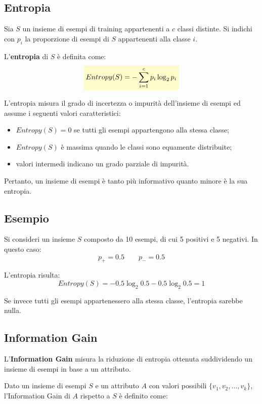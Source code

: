 \documentclass[a4paper,12pt]{report}
\newcommand{\highlight}[1]{%
\colorbox{yellow!20}{$\displaystyle #1$}%
}
\begin{document}
\subsection{Entropia}

Sia \( S \) un insieme di esempi di training appartenenti a \( c \) classi distinte.
Si indichi con \( p_i \) la proporzione di esempi di \( S \) appartenenti alla classe \( i \).

L’\textbf{entropia} di \( S \) è definita come:
\[
\highlight{
Entropy(S) = - \sum_{i=1}^{c} p_i \log_2 p_i }
\]

L’entropia misura il grado di incertezza o impurità dell’insieme di esempi ed assume i seguenti valori caratteristici:
\begin{itemize}
    \item \( Entropy(S) = 0 \) se tutti gli esempi appartengono alla stessa classe;
    \item \( Entropy(S) \) è massima quando le classi sono equamente distribuite;
    \item valori intermedi indicano un grado parziale di impurità.
\end{itemize}

Pertanto, un insieme di esempi è tanto più informativo quanto minore è la sua entropia.

\subsection*{Esempio}

Si consideri un insieme \( S \) composto da 10 esempi, di cui 5 positivi e 5 negativi.
In questo caso:
\[
p_+ = 0.5 \qquad p_- = 0.5
\]

L’entropia risulta:
\[
Entropy(S) = -0.5 \log_2 0.5 - 0.5 \log_2 0.5 = 1
\]

Se invece tutti gli esempi appartenessero alla stessa classe, l’entropia sarebbe nulla.

\subsection{Information Gain}

L’\textbf{Information Gain} misura la riduzione di entropia ottenuta suddividendo un insieme di esempi in base a un attributo.

Dato un insieme di esempi \( S \) e un attributo \( A \) con valori possibili \( \{v_1, v_2, \dots, v_k\} \),
l’Information Gain di \( A \) rispetto a \( S \) è definito come:
\end{document}
